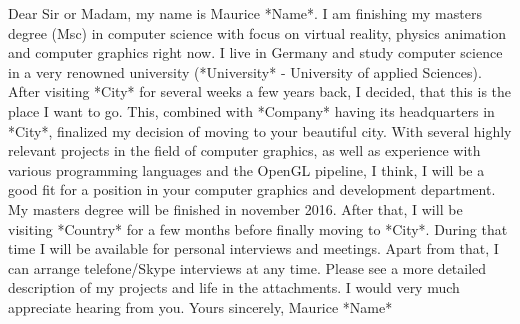 \documentclass[a4paper, 12pt]{article}
\begin{document}
\justify
Dear Sir or Madam,
\newline
\newline
my name is Maurice \**Name*. I am finishing my masters degree (Msc) in computer science with focus on virtual reality, physics animation
and computer graphics right now.
\newline
\newline
I live in Germany and study computer science in a very renowned university (\**University* - University of applied Sciences).
After visiting \**City* for several weeks a few years back, I decided, that this is the place I want to go. This, combined with \**Company* having its
headquarters in \**City*, finalized my decision of moving to your beautiful city.
\newline
\newline
With several highly relevant projects in the field of computer graphics, as well as experience with various programming languages and the
OpenGL pipeline, I think, I will be a good fit for a position in your computer graphics and development department.
\newline
\newline
My masters degree will be finished in november 2016. After that, I will be visiting \**Country* for a few months before finally moving to
\**City*.
During that time I will be available for personal interviews and meetings. Apart from that, I can arrange telefone/Skype interviews at any time.
Please see a more detailed description of my projects and life in the attachments.
\newline
\newline
I would very much appreciate hearing from you.
\newline
\newline
Yours sincerely,
\newline
\newline
Maurice \**Name*
\end{document}
